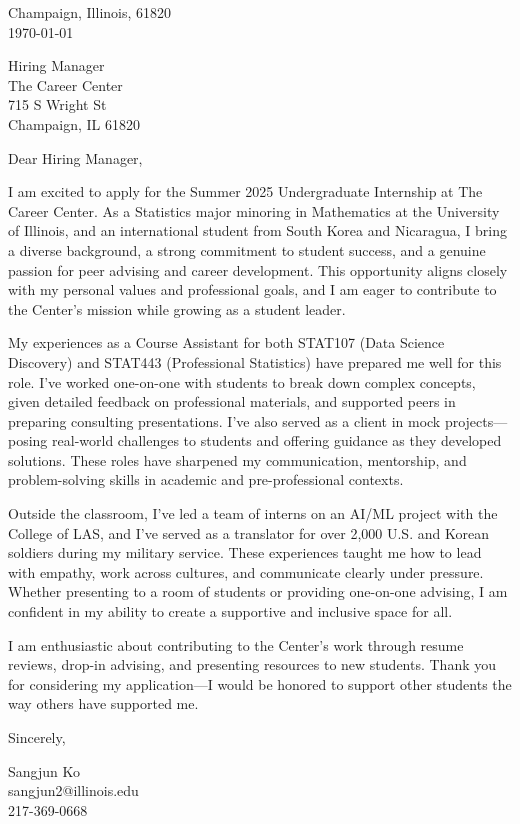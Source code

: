 \documentclass[11pt]{article}
\begin{document}
\noindent
Champaign, Illinois, 61820 \\
\today
\vspace{2em}

\noindent
Hiring Manager  \\
The Career Center \\ 
715 S Wright St  \\
Champaign, IL 61820  

\vspace{1.5em}

Dear Hiring Manager,

I am excited to apply for the Summer 2025 Undergraduate Internship at The Career Center. As a Statistics major minoring in Mathematics at the University of Illinois, and an international student from South Korea and Nicaragua, I bring a diverse background, a strong commitment to student success, and a genuine passion for peer advising and career development. This opportunity aligns closely with my personal values and professional goals, and I am eager to contribute to the Center’s mission while growing as a student leader.

My experiences as a Course Assistant for both STAT107 (Data Science Discovery) and STAT443 (Professional Statistics) have prepared me well for this role. I’ve worked one-on-one with students to break down complex concepts, given detailed feedback on professional materials, and supported peers in preparing consulting presentations. I’ve also served as a client in mock projects—posing real-world challenges to students and offering guidance as they developed solutions. These roles have sharpened my communication, mentorship, and problem-solving skills in academic and pre-professional contexts.

Outside the classroom, I’ve led a team of interns on an AI/ML project with the College of LAS, and I’ve served as a translator for over 2,000 U.S. and Korean soldiers during my military service. These experiences taught me how to lead with empathy, work across cultures, and communicate clearly under pressure. Whether presenting to a room of students or providing one-on-one advising, I am confident in my ability to create a supportive and inclusive space for all.

I am enthusiastic about contributing to the Center’s work through resume reviews, drop-in advising, and presenting resources to new students. Thank you for considering my application—I would be honored to support other students the way others have supported me.

\vspace{1em}

Sincerely,

\vspace{2em}

\noindent
Sangjun Ko\\
sangjun2@illinois.edu\\
217-369-0668
\end{document}
